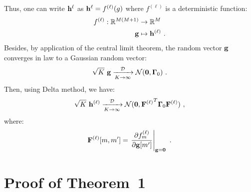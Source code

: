 \documentclass[journal, onecolumn]{IEEEtran}
\begin{document}
{\color{blue}
Thus, one can write ${\mathbf h}^{\ell}$ as ${\mathbf h}^{\ell}=f^{(\ell)}(g)$ where $f^{(\ell)}$ is a deterministic function:
\begin{align*}
f^{(\ell)} : {\mathbb R}^{M(M+1)} &\to {\mathbb R}^{M} \\
 {\mathbf g} &\mapsto {\mathbf h}^{(\ell)}\ . \\
\end{align*}
Besides, by application of the central limit theorem, the random vector ${\mathbf g}$ converges in law to a Gaussian random vector:
\[
\sqrt{K}\ {\mathbf g} \xrightarrow[K\to\infty]{{\mathcal D}} {\mathcal N}(\boldsymbol{0},\boldsymbol{\Gamma}_0)\ .
\]
Then, using Delta method, we have:
\begin{align*}
\sqrt{K}\ {\mathbf h}^{(\ell)} \xrightarrow[K\to\infty]{{\mathcal D}} {\mathcal N}(\boldsymbol{0},{{\mathbf F}^{(\ell)}}^T\boldsymbol{\Gamma}_0{\mathbf F}^{(\ell)})\ ,
\end{align*}
where:
\[
{\mathbf F}^{(\ell)}[m,m'] = \left.\dfrac{\partial f^{(\ell)}_m}{\partial{\mathbf g}[m']}\right\vert_{{\mathbf g}=\boldsymbol{0}}\ .
\]
}

\section{Proof of Theorem~1}
\label{ap:th.error}
\end{document}
